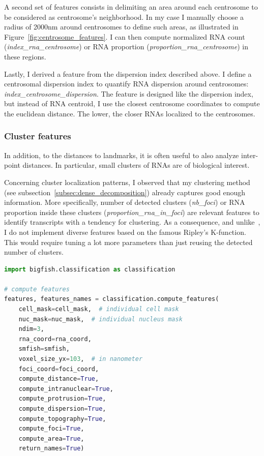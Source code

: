 A second set of features consists in delimiting an area around each centrosome to be considered as centrosome's neighborhood.
In my case I manually choose a radius of 2000nm around centrosomes to define such areas, as illustrated in Figure~\ref{fig:centrosome_features}.
I can then compute normalized \ac{RNA} count (\emph{index\_rna\_centrosome}) or \ac{RNA} proportion (\emph{proportion\_rna\_centrosome}) in these regions.

Lastly, I derived a feature from the dispersion index described above.
I define a centrosomal dispersion index to quantify \ac{RNA} dispersion around centrosomes: \emph{index\_centrosome\_dispersion}. The feature is designed like the 
dispersion index, but instead of \ac{RNA} centroid, I use the closest centrosome coordinates to compute the euclidean distance.
The lower, the closer \ac{RNA}s localized to the centrosomes.

\subsubsection{Cluster features}

In addition, to the distances to landmarks, it is often useful to also analyze inter-point distances. In particular, small clusters of \ac{RNA}s are of biological interest. 

Concerning cluster localization patterns, I observed that my clustering method (see subsection~\ref{subsec:dense_decomposition}) already captures good enough information.
More specifically, number of detected clusters (\emph{nb\_foci}) or \ac{RNA} proportion inside these clusters (\emph{proportion\_rna\_in\_foci}) are relevant features to identify transcripts with a tendency for clustering.
As a consequence, and unlike~\cite{samacoits_computational_2018}, I do not implement diverse features based on the famous Ripley's K-function.
This would require tuning a lot more parameters than just reusing the detected number of clusters.\\

\begin{minipage}{0.9\textwidth}
\begin{lstlisting}[language=Python]
import bigfish.classification as classification

# compute features
features, features_names = classification.compute_features(
    cell_mask=cell_mask,  # individual cell mask
	nuc_mask=nuc_mask,  # individual nucleus mask
	ndim=3,
	rna_coord=rna_coord,
    smfish=smfish,
	voxel_size_yx=103,  # in nanometer
    foci_coord=foci_coord,
    compute_distance=True,
    compute_intranuclear=True,
    compute_protrusion=True,
    compute_dispersion=True,
    compute_topography=True,
    compute_foci=True,
    compute_area=True,
    return_names=True)
\end{lstlisting}
\end{minipage}

